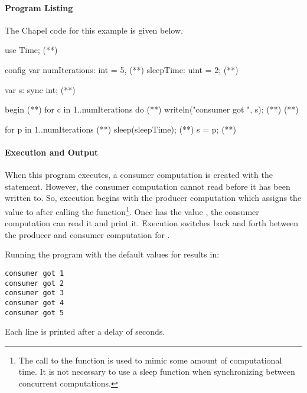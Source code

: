 \paragraph{Program Listing}
The Chapel code for this example is given below.

\begin{numberedchapel}
use Time;                           (*\label{use_time}*)

config var numIterations: int = 5,  (*\label{prodcons_var_1}*)
           sleepTime: uint = 2;     (*\label{prodcons_var_2}*)

var s: sync int;                    (*\label{prodcons_var_3}*)

begin {                                (*\label{consumer_start}*)
  for c in 1..numIterations do         (*\label{consumer_for_1}*)
    writeln("consumer got ", s);       (*\label{consumer_for_2}*)
}                                      (*\label{consumer_end}*)

for p in 1..numIterations {            (*\label{producer_start}*)
  sleep(sleepTime);   (*\label{sleep_call}*)
  s = p;
}                                      (*\label{producer_end}*)
\end{numberedchapel}

\paragraph{Execution and Output}
When this program executes, a consumer computation is created with the 
statement.
However, the consumer computation cannot read  before it has been written
to.  So, execution begins with the producer computation which assigns the value
 to  after calling the  function\footnote{The call to
the  function 
is used to mimic some amount of computational time.  It is not necessary to use
a sleep function when synchronizing between concurrent computations.}.   
Once  has the
value , the consumer computation can read it and print it.  Execution
switches back and forth between the producer and consumer computation for
.

Running the program with the default
values for  results in:
{\small
\begin{verbatim}
consumer got 1
consumer got 2
consumer got 3
consumer got 4
consumer got 5
\end{verbatim}}
Each line is printed after a delay of  seconds.

